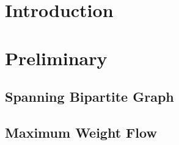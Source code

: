 \begin{abstract}

\end{abstract}

\section{Introduction}


\section{Preliminary}


	\subsection{Spanning Bipartite Graph}
	
	
	\subsection{Maximum Weight Flow}
	

% 

\section{\FIXEDCARPOOL{}}


\section{\UWCARPOOL{}}


\section{\UCUDCARPOOL{}}


\section{\CARPOOL{}}

